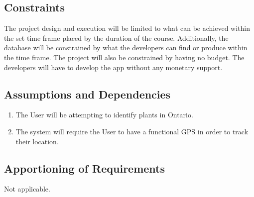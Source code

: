 \documentclass[]{article}
\begin{document}
\subsection{Constraints}
\label{sub:constraints}
{\color{red}
 The project design and execution will be limited to what can be achieved within the set time frame placed by the duration of the course. Additionally, the database will be constrained by what the developers can find or produce within the time frame. The project will also be constrained by having no budget. The developers will have to develop the app without any monetary support.}

\subsection{Assumptions and Dependencies}
\label{sub:assumptions_and_dependencies}
\begin{enumerate}
	\item The User will be attempting to identify plants in Ontario.
	\item The system will require the User to have a functional GPS in order to track their location. 
\end{enumerate}

\subsection{Apportioning of Requirements}
\label{sub:apportioning_of_requirements}
Not applicable.

\end{document}
